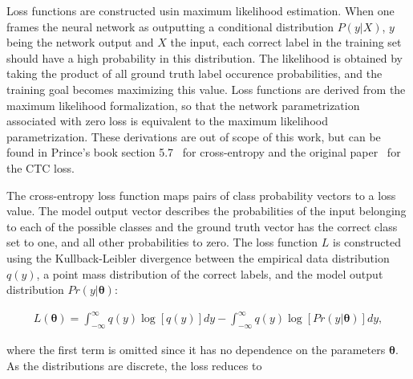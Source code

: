 \documentclass[english,twoside,openright]{UH_DS_MSc}
\begin{document}
Loss functions are constructed usin maximum likelihood estimation. When one frames the neural network as outputting 
a conditional distribution $P(y|X)$, $y$ being the network output and $X$ the input, each correct label in the 
training set should have a high probability in this distribution. The likelihood is obtained by taking the product of 
all ground truth label occurence probabilities, and the training goal becomes maximizing this value. Loss functions are derived 
from the maximum likelihood formalization, so that the network parametrization associated with zero loss is equivalent to 
the maximum likelihood parametrization. These derivations are out of scope of this work, but can be found in Prince's book
section 5.7~\cite{princebook} for cross-entropy and the original paper~\cite{ctcloss} for the CTC loss.

The cross-entropy loss function maps pairs of class probability vectors 
to a loss value. The model output vector describes the probabilities 
of the input belonging to each of the possible classes and the ground
 truth vector has the correct 
class set to one, and all other probabilities to zero. The loss function $L$ 
is constructed using the Kullback-Leibler divergence between the empirical data distribution $q(y)$,
a point mass distribution of the correct labels,
 and the model output distribution 
$Pr(y|\mathbf{\theta})$:

\begin{align}
    L(\mathbf{\theta})=\int_{-\infty}^{\infty}q(y)\log[q(y)]dy-\int_{-\infty}^{\infty}q(y)\log[Pr(y|\mathbf{\theta})]dy,
\end{align}

where the first term is omitted since it has no dependence on the parameters $\mathbf{\theta}$.
As the distributions are discrete, the loss reduces to
\end{document}
